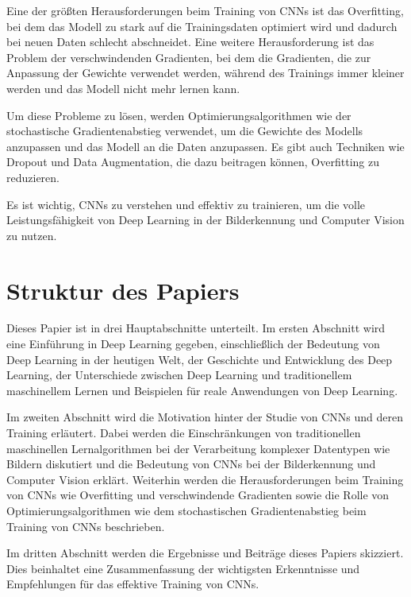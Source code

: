 Eine der größten Herausforderungen beim Training von CNNs ist das Overfitting, bei dem das Modell zu stark auf die Trainingsdaten optimiert wird und dadurch bei neuen Daten schlecht abschneidet. Eine weitere Herausforderung ist das Problem der verschwindenden Gradienten, bei dem die Gradienten, die zur Anpassung der Gewichte verwendet werden, während des Trainings immer kleiner werden und das Modell nicht mehr lernen kann. 

Um diese Probleme zu lösen, werden Optimierungsalgorithmen wie der stochastische Gradientenabstieg verwendet, um die Gewichte des Modells anzupassen und das Modell an die Daten anzupassen. Es gibt auch Techniken wie Dropout und Data Augmentation, die dazu beitragen können, Overfitting zu reduzieren. 

Es ist wichtig, CNNs zu verstehen und effektiv zu trainieren, um die volle Leistungsfähigkeit von Deep Learning in der Bilderkennung und Computer Vision zu nutzen. 

\section{Struktur des Papiers}

Dieses Papier ist in drei Hauptabschnitte unterteilt. Im ersten Abschnitt wird eine Einführung in Deep Learning gegeben, einschließlich der Bedeutung von Deep Learning in der heutigen Welt, der Geschichte und Entwicklung des Deep Learning, der Unterschiede zwischen Deep Learning und traditionellem maschinellem Lernen und Beispielen für reale Anwendungen von Deep Learning.

Im zweiten Abschnitt wird die Motivation hinter der Studie von CNNs und deren Training erläutert. Dabei werden die Einschränkungen von traditionellen maschinellen Lernalgorithmen bei der Verarbeitung komplexer Datentypen wie Bildern diskutiert und die Bedeutung von CNNs bei der Bilderkennung und Computer Vision erklärt. Weiterhin werden die Herausforderungen beim Training von CNNs wie Overfitting und verschwindende Gradienten sowie die Rolle von Optimierungsalgorithmen wie dem stochastischen Gradientenabstieg beim Training von CNNs beschrieben.

Im dritten Abschnitt werden die Ergebnisse und Beiträge dieses Papiers skizziert. Dies beinhaltet eine Zusammenfassung der wichtigsten Erkenntnisse und Empfehlungen für das effektive Training von CNNs.